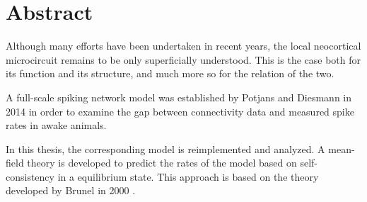 \section{Abstract}
\label{abstract}
Although many efforts have been undertaken in recent years, the 
local neocortical microcircuit remains to be only superficially 
understood. This is the case both for its function and its structure, 
and much more so for the relation of the two. 

A full-scale spiking network model was established by Potjans and 
Diesmann \cite{potjans2014} in 2014 in order 
to examine the gap between connectivity data and measured spike rates
in awake animals.

In this thesis, the corresponding model is reimplemented and analyzed. 
A mean-field theory is developed to predict the rates of the model
based on self-consistency in a equilibrium state. This approach is based 
on the theory developed by Brunel in 2000 \cite{brunel2000}. 



